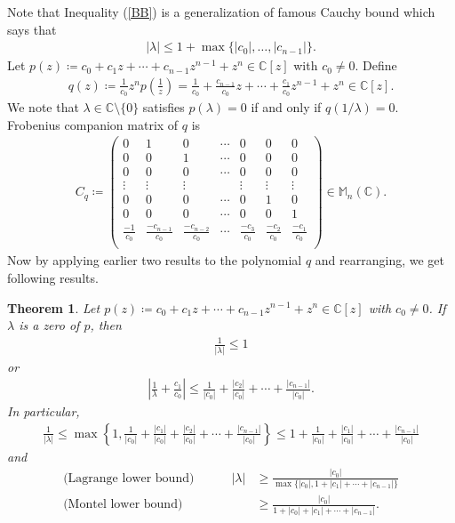 \documentclass{amsart}
\newtheorem{theorem}{Theorem}[section]
\begin{document}
Note that Inequality (\ref{BB}) is a generalization of famous Cauchy bound \cite{MARDEN} which says that 
\begin{align*}
		|\lambda|\leq 1+\max\{|c_0|, \dots, |c_{n-1}|\}.
\end{align*}
Let $p(z)\coloneqq c_0+c_1z+\cdots +c_{n-1}z^{n-1}+z^n \in \mathbb{C}[z]$ with $c_0\neq 0$. Define 
\begin{align*}
	q(z)\coloneqq \frac{1}{c_0}z^np\left(\frac{1}{z}\right)=\frac{1}{c_0}+\frac{c_{n-1}}{c_0}z+\cdots +\frac{c_{1}}{c_0}z^{n-1}+z^n \in  \mathbb{C}[z].
\end{align*}
We note that $\lambda \in \mathbb{C}\setminus \{0\}$ satisfies $p(\lambda)=0$ if and only if $q(1/\lambda)=0$. Frobenius companion matrix of $q$ is 
\begin{align*}
	C_q\coloneqq 
	\begin{pmatrix}
		0&1&0&\cdots &0 &0&0\\
		0&0&1&\cdots &0 &0&0\\
		0&0&0&\cdots &0 &0&0\\
		\vdots &\vdots &\vdots & & \vdots &\vdots &\vdots\\
		0&0&0&\cdots &0 &1&0\\
		0&0&0&\cdots &0 &0&1\\
		\frac{-1}{c_0}&	\frac{-c_{n-1}}{c_0}&\frac{-c_{n-2}}{c_0}&\cdots &\frac{-c_3}{c_0}& \frac{-c_{2}}{c_0}&\frac{-c_{1}}{c_0}\\
	\end{pmatrix} \in \mathbb{M}_n(\mathbb{C}).
\end{align*}
Now by applying earlier two results to the polynomial $q$ and rearranging, we get following results. 
\begin{theorem} \cite{BELL, HORNJOHNSON}
	Let $p(z)\coloneqq c_0+c_1z+\cdots +c_{n-1}z^{n-1}+z^n \in \mathbb{C}[z]$ with $c_0\neq 0$.  If $\lambda$ is a  zero of $p$, then 
	\begin{align*}
		\frac{1}{|\lambda|}\leq 1
	\end{align*}
	or 
	\begin{align*}
		\left|\frac{1}{\lambda}+\frac{c_1}{c_0}\right|\leq\frac{1}{|c_0|}+\frac{|c_2|}{|c_0|}+\cdots +\frac{|c_{n-1}|}{|c_0|}.
	\end{align*}
	In particular, 
	\begin{align*}
			\frac{1}{|\lambda|} \leq \max\left\{1,  \frac{1}{|c_0|}+\frac{|c_1|}{|c_0|}+\frac{|c_2|}{|c_0|}+\cdots +\frac{|c_{n-1}|}{|c_0|}\right\}\leq 1+\frac{1}{|c_0|}+\frac{|c_1|}{|c_0|}+\cdots +\frac{|c_{n-1}|}{|c_0|}
	\end{align*}
and 
	\begin{align*}
	\text{(Lagrange lower bound)} \quad \quad \quad 	|\lambda|&\geq \frac{|c_0|}{\max\{|c_0|, 1+|c_1|+\cdots+|c_{n-1}|\}}\\
	\text{(Montel lower bound)} \quad \quad \quad	&\geq \frac{|c_0|}{1+|c_0|+|c_1|+\cdots+|c_{n-1}|}.
\end{align*}
\end{theorem}
\end{document}
